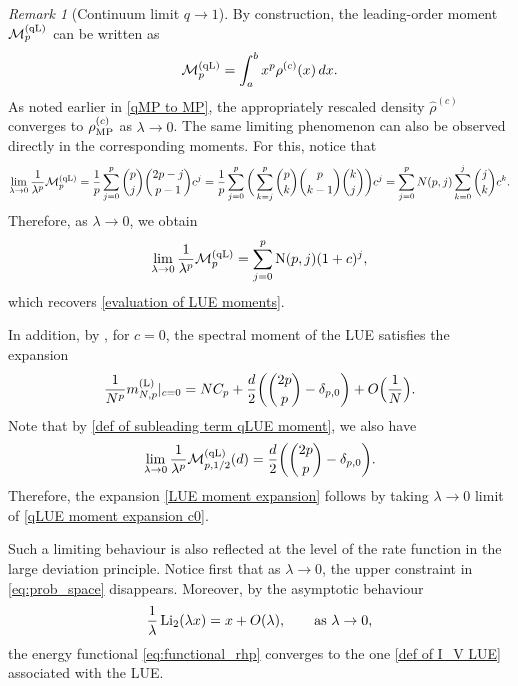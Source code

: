 \documentclass{amsart}
\newcommand{\Li}{\operatorname{Li}}
\theoremstyle{plain}
\theoremstyle{remark}
\newtheorem{rem}{Remark}
\numberwithin{equation}{section}
\begin{document}
\begin{rem}[Continuum limit $q\to1$] \label{Rem_continuum limit q1}
By construction, the leading-order moment $\mathcal{M}_p^{\rm (qL)}$ can be written as 
\begin{equation}
\mathcal{M}_p^{ \rm (qL) } = \int_{a}^b x^p \rho^{(c)}(x)\,dx. 
\end{equation}
As noted earlier in \eqref{qMP to MP}, the appropriately rescaled density 
$\widehat{\rho}^{(c)}$ converges to $\rho_{\rm MP}^{(c)}$ as $\lambda \to 0$. 
The same limiting phenomenon can also be observed directly in the corresponding moments. 
For this, notice that 
   \begin{align*}
\lim_{\lambda\rightarrow0}  \frac{1}{\lambda^{p}}\mathcal{M}_{p}^{ \rm (qL) } = \frac{1}{  p} \sum_{j=0}^p \binom{p}{j} \binom{2p-j}{p-1} c^{j}  
= \frac{1}{p} \sum_{j=0}^p \bigg( \sum_{k=j}^p \binom{p}{k}\binom{p}{k-1} \binom{k}{j} \bigg) c^j  =   \sum_{j=0}^p N(p,j)\sum_{k=0}^j \binom{j}{k} c^k. 
\end{align*} 
Therefore, as $\lambda \to 0$, we obtain
  \begin{equation} 
        \lim_{\lambda\rightarrow0}\frac{1}{\lambda^{p}}\mathcal{M}_{p}^{ \rm (qL) }  =\sum_{j=0}^{p}\mathrm{N}(p,j)(1+c)^{j} ,
    \end{equation} 
which recovers \eqref{evaluation of LUE moments}.

In addition, by \cite[Eq.~(3.46)]{FRW17}, for $c=0$, the spectral moment of the LUE satisfies the expansion  
\begin{align} \label{LUE moment expansion}
 \frac{1}{N^p}m_{N,p}^{ \rm (L) }|_{c=0} = N C_p + \frac{d}{2}\bigg( \binom{2p}{p}-\delta_{p,0} \bigg) +O\Big(\frac{1}{N}\Big).  
\end{align}
Note that by \eqref{def of subleading term qLUE moment}, we also have 
\begin{align*}
\lim_{\lambda \to 0} \frac{1}{\lambda^p} \mathcal{M}_{p,1/2}^{ \rm (qL) }(d) = \frac{d}{2}\bigg( \binom{2p}{p}-\delta_{p,0} \bigg). 
\end{align*}
Therefore, the expansion \eqref{LUE moment expansion} follows by taking $\lambda \to 0$ limit of \eqref{qLUE moment expansion c0}. 
 

Such a limiting behaviour is also reflected at the level of the rate function in the large deviation principle. Notice first that as $\lambda \to 0$, the upper constraint in \eqref{eq:prob_space} disappears. Moreover, by the asymptotic behaviour  
\begin{equation}
\frac{1}{\lambda} \Li_2(\lambda x)= x +O(\lambda), \qquad \textup{as } \lambda \to 0, 
\end{equation}
the energy functional \eqref{eq:functional_rhp} converges to the one \eqref{def of I_V LUE} associated with the LUE.
\end{rem}
\end{document}
